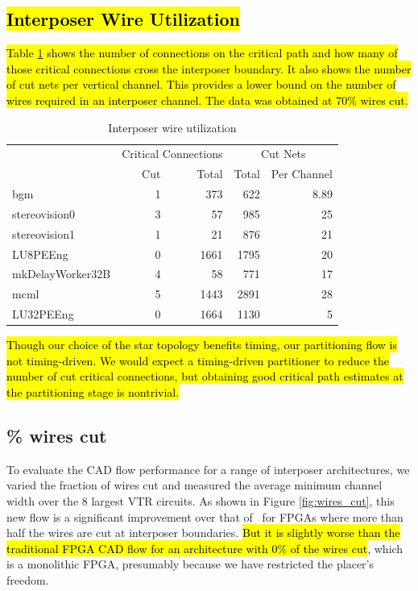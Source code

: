 \subsection{\hl{Interposer Wire Utilization}}
\hl{Table \mbox{\ref{table:interposer_wire_utilization}} shows the number of connections on the critical path and how many of those critical connections cross the interposer boundary. It also shows the number of cut nets per vertical channel. This provides a lower bound on the number of wires required in an interposer channel. The data was obtained at 70\% wires cut.}
\begin{table}[!htbp]
\centering
\caption{Interposer wire utilization}
\begin{tabular}{|l|r|r||r|r|}
\hline
 & \multicolumn{2}{c||}{Critical Connections} & \multicolumn{2}{c|}{Cut Nets} \\
 & Cut & Total & Total & Per Channel \\ \hline
bgm & 1 & 373 & 622 & 8.89 \\ \hline
stereovision0 & 3 & 57 & 985 & 25 \\ \hline
stereovision1 & 1 & 21 & 876 & 21 \\ \hline
LU8PEEng & 0 & 1661 & 1795 & 20 \\ \hline
mkDelayWorker32B & 4 & 58 & 771 & 17 \\ \hline
mcml & 5 & 1443 & 2891 & 28 \\ \hline
LU32PEEng & 0 & 1664 & 1130 & 5 \\ \hline
\end{tabular}
\label{table:interposer_wire_utilization}
\end{table}

\hl{Though our choice of the star topology benefits timing, our partitioning flow is not timing-driven. We would expect a timing-driven partitioner to reduce the number of cut critical connections, but obtaining good critical path estimates at the partitioning stage is nontrivial\mbox{\cite{hutton}}.}

\subsection{\% wires cut}
To evaluate the CAD flow performance for a range of interposer architectures, we varied the fraction of wires cut and measured the average minimum channel width over the 8 largest VTR circuits. As shown in Figure \ref{fig:wires_cut}, this new flow is a significant improvement over that of~\cite{interposer2014} for FPGAs where more than half the wires are cut at interposer boundaries. \hl{But it is slightly worse than the traditional FPGA CAD flow for an architecture with 0\% of the wires cut}, which is a monolithic FPGA, presumably because we have restricted the placer's freedom.


